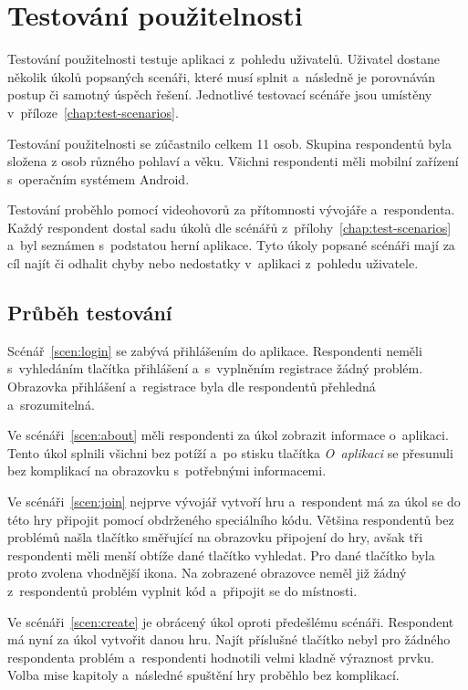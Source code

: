 \section{Testování použitelnosti}
\label{sec:usability}

Testování použitelnosti testuje aplikaci z~pohledu uživatelů.
Uživatel dostane několik úkolů popsaných scenáři,
které musí splnit a~následně je porovnáván postup či samotný úspěch řešení.
Jednotlivé testovací scénáře jsou umístěny v~příloze~\ref{chap:test-scenarios}.

Testování použitelnosti se zúčastnilo celkem 11 osob.
Skupina respondentů byla složena z osob různého pohlaví a věku.
Všichni respondenti měli mobilní zařízení s~operačním systémem Android.

Testování proběhlo pomocí videohovorů za přítomnosti vývojáře a~respondenta.
Každý respondent dostal sadu úkolů dle scénářů
z~přílohy~\ref{chap:test-scenarios}
a~byl seznámen s~podstatou herní aplikace.
Tyto úkoly popsané scénáři mají za cíl najít či odhalit chyby nebo nedostatky
v~aplikaci z~pohledu uživatele.

\subsection{Průběh testování}

Scénář~\ref{scen:login} se zabývá přihlášením do aplikace.
Respondenti neměli s~vyhledáním tlačítka přihlášení
a~s~vyplněním registrace žádný problém.
Obrazovka přihlášení a~registrace byla dle respondentů přehledná a~srozumitelná.

Ve scénáři~\ref{scen:about} měli respondenti za úkol zobrazit informace
o~aplikaci.
Tento úkol splnili všichni bez potíží a~po stisku tlačítka \emph{O~aplikaci}
se přesunuli bez komplikací na obrazovku s~potřebnými informacemi.

Ve scénáři~\ref{scen:join} nejprve vývojář vytvoří hru a~respondent má za úkol
se do této hry připojit pomocí obdrženého speciálního kódu.
Většina respondentů bez problémů našla tlačítko směřující na obrazovku připojení
do hry,
avšak tři respondenti měli menší obtíže dané tlačítko vyhledat.
Pro dané tlačítko byla proto zvolena vhodnější ikona.
Na zobrazené obrazovce neměl již žádný z~respondentů problém vyplnit kód
a~připojit se do místnosti.

Ve scénáři~\ref{scen:create} je obrácený úkol oproti předešlému scénáři.
Respondent má nyní za úkol vytvořit danou hru.
Najít příslušné tlačítko nebyl pro žádného respondenta problém
a~respondenti hodnotili velmi kladně výraznost prvku.
Volba mise kapitoly a~následné spuštění hry proběhlo bez komplikací.

